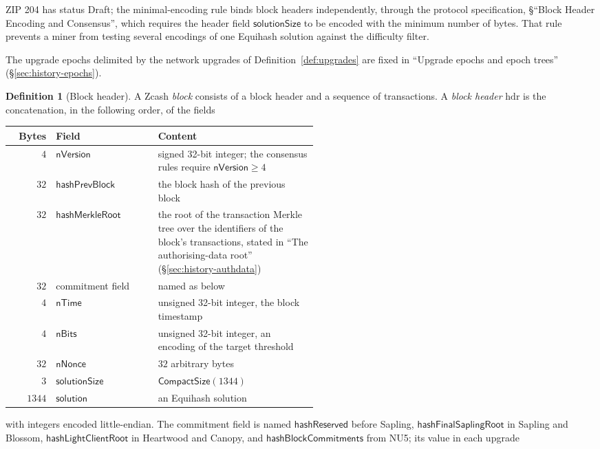 \documentclass[11pt,a4paper]{article}
\theoremstyle{definition}
\newtheorem{definition}[theorem]{Definition}
\begin{document}
ZIP 204 has status Draft; the minimal-encoding rule binds block headers
independently, through the protocol specification,
\S``Block Header Encoding and Consensus'', which requires the header field
$\mathsf{solutionSize}$ to be encoded with the minimum number of bytes.
That rule prevents a miner from testing several encodings of one Equihash
solution against the difficulty filter.

The upgrade epochs delimited by the network upgrades of
Definition~\ref{def:upgrades} are fixed in ``Upgrade epochs and epoch trees''
(\S\ref{sec:history-epochs}).

\begin{definition}[Block header]\label{def:header}
A Zcash \emph{block} consists of a block header and a sequence of
transactions. A \emph{block header} $\mathrm{hdr}$ is the concatenation, in the
following order, of the fields
\begin{center}
\small
\begin{tabular}{@{}r l p{0.52\linewidth}@{}}
\toprule
Bytes & Field & Content \\
\midrule
$4$ & $\mathsf{nVersion}$ & signed 32-bit integer; the consensus rules
  require $\mathsf{nVersion} \ge 4$ \\
$32$ & $\mathsf{hashPrevBlock}$ & the block hash of the previous block \\
$32$ & $\mathsf{hashMerkleRoot}$ & the root of the transaction Merkle tree
  over the identifiers of the block's transactions, stated in ``The
  authorising-data root'' (\S\ref{sec:history-authdata}) \\
$32$ & commitment field & named as below \\
$4$ & $\mathsf{nTime}$ & unsigned 32-bit integer, the block timestamp \\
$4$ & $\mathsf{nBits}$ & unsigned 32-bit integer, an encoding of the
  target threshold \\
$32$ & $\mathsf{nNonce}$ & $32$ arbitrary bytes \\
$3$ & $\mathsf{solutionSize}$ & $\mathsf{CompactSize}(1344)$ \\
$1344$ & $\mathsf{solution}$ & an Equihash solution \\
\bottomrule
\end{tabular}
\end{center}
with integers encoded little-endian. The commitment field is named
$\mathsf{hashReserved}$ before Sapling, $\mathsf{hashFinalSaplingRoot}$ in
Sapling and Blossom, $\mathsf{hashLightClientRoot}$ in Heartwood and Canopy,
and $\mathsf{hashBlockCommitments}$ from NU5; its value in each upgrade

\end{definition}
\end{document}
